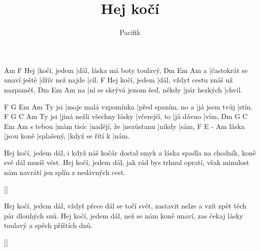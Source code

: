 \documentclass{song}
\title{Hej kočí}
\author{Pacifik}
\begin{document}
\strophe
    Am           F
Hej |kočí, jedem |dál, láska má boty toulavý,
  Dm                        Em              Am
a |častokrát se unaví ještě |dřív než najde |cíl.
                F
Hej kočí, jedem |dál, vždyť cestu znáš už nazpaměť,
   Dm                             Em           Am
na |ní se skrývá jenom šeď, někdy |pár hezkých |chvil.
\endstrophe



       F                    G                  Em            Am
Ty jsi |moje malá vzpomínka |před spaním, no a |já jsem tvůj |stín.
       F                         G             C         Am
Ty jsi |jiná nežli všechny lásky |včerejší, to |já dávno |vím,
        Dm         G           C          Em     Am
s tebou |mám tisíc |nadějí, že |nezůstanu |nikdy |sám,
      F          E          -               Am
láska |jsou koně |splašený, |když se řítí k |nám.
\endstrophe

\strophe*
Hej kočí, jedem dál, i když náš kočár dostal smyk
a láska spadla na chodník, koně své dál musíš vést.
Hej kočí, jedem dál, jak rád bys trhnul opratí,
však minulost nám navrátí jen splín z nedávných cest.
\endstrophe

\ref{}

\strophe*
Hej kočí, jedem dál, vždyť přece dál se točí svět,
zastavit nelze a vzít zpět těch pár dlouhých snů.
Hej kočí, jedem dál, než se nám koně unaví,
zas čekaj lásky toulavý a spěch příštích dnů.
\endstrophe

\ref{}
\end{document}
